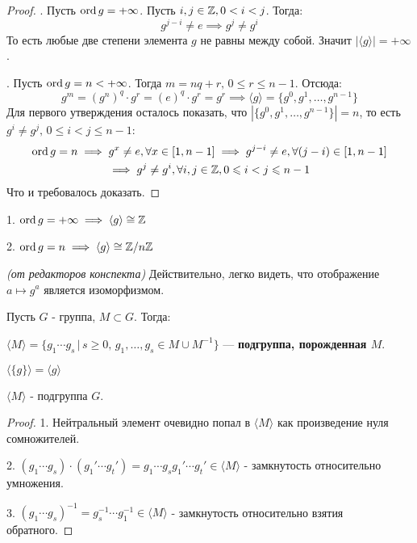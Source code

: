 \documentclass[../main.tex]{subfiles}
\begin{document}
\begin{proof}
    . Пусть $\operatorname{ord} g = +\infty$. Пусть $i, j \in \mathbb{Z}, 0 < i < j$. Тогда:
    \begin{equation*}
        g^{j - i} \neq e \implies g^{j} \neq g^{i}
    \end{equation*}
    То есть любые две степени элемента $g$ не равны между собой. Значит $|\langle g \rangle| = +\infty$.

    . Пусть $\operatorname{ord} g = n < +\infty$. Тогда $m = nq + r, \, 0 \leq r \leq n - 1$. Отсюда:
    \begin{equation*}
        g^m = (g^n)^{q} \cdot g^r = (e)^{q} \cdot g^r = g^r \implies \langle g \rangle = \{g^0, g^1, \dotsc, g^{n - 1}\}
    \end{equation*}
    Для первого утверждения осталось показать, что $|\{g^0, g^1, \dotsc, g^{n - 1}\}| = n$, то есть $g^i \ne g^j, \, 0 \leq i < j \leq n - 1$:
    \begin{equation*}
    \begin{gathered}
        \operatorname{ord} g = n \implies g^x \neq e, \forall x \in [1, n - 1]  \implies g^{j - i} \neq e,\forall (j - i) \in [1, n - 1] \\
        \implies g^{j} \neq g^{i}, \forall i,j \in \mathbb{Z}, 0 \leqslant i < j \leqslant n - 1
    \end{gathered}
    \end{equation*}
    Что и требовалось доказать.
\end{proof}
\begin{remark}
    1. $\operatorname{ord} g = +\infty \implies \langle g \rangle \cong \mathbb{Z}$

    2. $\operatorname{ord} g = n \implies \langle g \rangle \cong \mathbb{Z}/n\mathbb{Z}$

    \textit{(от редакторов конспекта)} Действительно, легко видеть, что отображение $a \mapsto g^a$ является изоморфизмом.
\end{remark}
\begin{definition}
    Пусть $G$ - группа, $M \subset G$. Тогда:

    $\langle M \rangle = \{g_1 \dotsm g_s \, | \, s \geq 0,\, g_1, \dotsc, g_s \in M \cup M^{-1}\}$ --- \textbf{подгруппа, порожденная $M$}.
\end{definition}
\begin{remark}
    $\langle \{g\} \rangle = \langle g \rangle$
\end{remark}
\begin{theorem-non}
    $\langle M \rangle$ - подгруппа $G$.
\end{theorem-non}
\begin{proof}
    1. Нейтральный элемент очевидно попал в $\langle M \rangle$ как произведение нуля сомножителей.

    2. $(g_1 \dotsm g_s) \cdot (g_1' \dotsm g_t') = g_1 \dotsm g_s g_1' \dotsm g_t' \in \langle M \rangle$ - замкнутость относительно умножения.

    3. $(g_1 \dotsm g_s)^{-1} = g_s^{-1} \dotsm g_1^{-1} \in \langle M \rangle$ - замкнутость относительно взятия обратного.
\end{proof}
\end{document}
